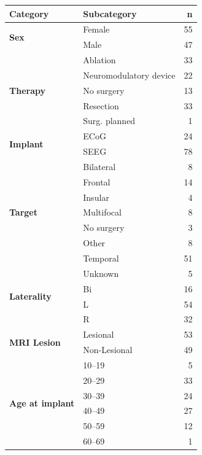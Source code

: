 \documentclass[11pt]{article}
\begin{document}
\begin{table}[h!]
\centering
\begin{tabular}{l|l|r}
\hline
\textbf{Category} & \textbf{Subcategory} & \textbf{n} \\
\hline
\multirow{2}{*}{\textbf{Sex}} 
    & Female & 55 \\ \cline{2-3}
    & Male   & 47 \\ 
\hline
\multirow{5}{*}{\textbf{Therapy}} 
    & Ablation                & 33 \\ \cline{2-3}
    & Neuromodulatory device  & 22 \\ \cline{2-3}
    & No surgery              & 13 \\ \cline{2-3}
    & Resection               & 33 \\ \cline{2-3}
    & Surg. planned            & 1  \\ 
\hline
\multirow{2}{*}{\textbf{Implant}} 
    & ECoG & 24 \\ \cline{2-3}
    & SEEG & 78 \\ 
\hline
\multirow{7}{*}{\textbf{Target}} 
    & Bilateral & 8  \\ \cline{2-3}
    & Frontal   & 14 \\ \cline{2-3}
    & Insular   & 4  \\ \cline{2-3}
    & Multifocal& 8  \\ \cline{2-3}
    & No surgery& 3  \\ \cline{2-3}
    & Other     & 8  \\ \cline{2-3}
    & Temporal  & 51 \\ 
\hline
\multirow{4}{*}{\textbf{Laterality}} 
    & Unknown & 5  \\ \cline{2-3}
    & Bi      & 16 \\ \cline{2-3}
    & L       & 54 \\ \cline{2-3}
    & R       & 32 \\ 
\hline
\multirow{2}{*}{\textbf{MRI Lesion}} 
    & Lesional     & 53 \\ \cline{2-3}
    & Non-Lesional & 49 \\ 
\hline
\multirow{6}{*}{\textbf{Age at implant}} 
    & 10--19 & 5  \\ \cline{2-3}
    & 20--29 & 33 \\ \cline{2-3}
    & 30--39 & 24 \\ \cline{2-3}
    & 40--49 & 27 \\ \cline{2-3}
    & 50--59 & 12 \\ \cline{2-3}
    & 60--69 & 1  \\ 

\end{tabular}
\end{table}
\end{document}
